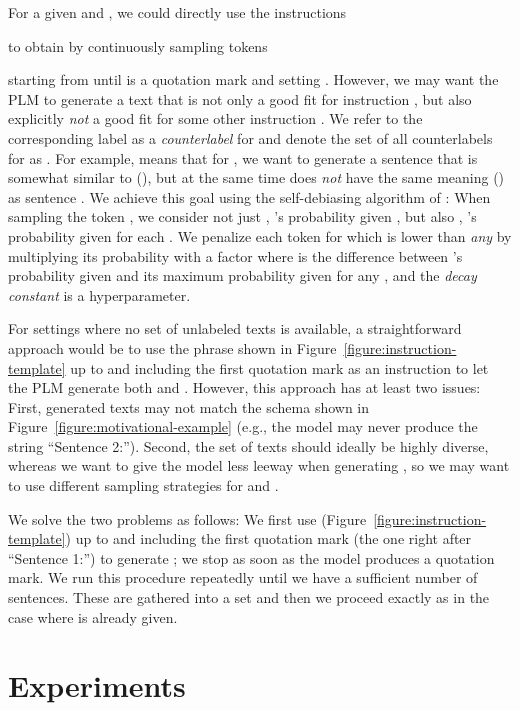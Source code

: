 \documentclass[11pt]{article}
\begin{document}
For a given  and , we could
directly use the  instructions

to obtain  by continuously sampling tokens

starting from  until  is a quotation mark and
setting . However, we
may want the PLM to generate a text  that is
not only a good fit for instruction , but
also explicitly \emph{not} a good fit for some other
instruction . We refer to the
corresponding label  as a \emph{counterlabel} for 
and denote the set of all counterlabels for  as
. For example,  means that
for , we want  to generate a sentence
 that is somewhat similar to (), but at
the same time does \emph{not}
have the same meaning () as sentence
. We achieve this goal using the
self-debiasing algorithm of \citet{schick2021selfdiagnosis}:
When sampling the token , we consider not just ,
's  probability given , but also , 's probability given  for each . We penalize each token  for which  is lower than \emph{any}  by multiplying its probability with a factor
 where 
 is the difference between 's probability given  and its maximum probability given  for any , and the \emph{decay constant}  is a hyperparameter.

For settings where no set of unlabeled texts  is
available, a straightforward approach would be to use the
phrase shown in Figure~\ref{figure:instruction-template} up
to and including the first quotation mark as an instruction
to let the PLM generate both  and
. However, this approach has at least two
issues: First, generated texts may not match the schema
shown in Figure~\ref{figure:motivational-example} (e.g., the
model may never produce the string ``Sentence 2:''). Second,
the set of texts  should ideally be highly
diverse, whereas we want to give the model less leeway when
generating , so
we may want to use different sampling strategies for
 and .

We solve the two problems as follows: We first use 
(Figure~\ref{figure:instruction-template}) up to and
including the first quotation mark
(the one right after ``Sentence 1:'')
to generate
; we stop as soon as the model produces a
quotation mark.
We run this procedure repeatedly until we have a sufficient
number of  sentences. These are gathered into
a set  and then we proceed exactly as in the case where 
is already given.

\section{Experiments}
\end{document}
